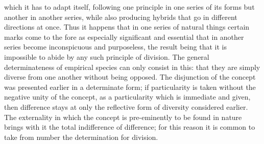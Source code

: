 which it has to adapt itself, following one principle in one series of its
forms but another in another series, while also producing hybrids that go
in different directions at once. Thus it happens that in one series of natural
things certain marks come to the fore as especially significant and essential
that in another series become inconspicuous and purposeless, the result
being that it is impossible to abide by any such principle of division.
The general determinateness of empirical species can only consist in this:
that they are simply diverse from one another without being opposed. The
disjunction of the concept was presented earlier in a determinate form;
if particularity is taken without the negative unity of the concept, as a
particularity which is immediate and given, then difference stays at only
the reflective form of diversity considered earlier. The externality in which
the concept is pre-eminently to be found in nature brings with it the total
indifference of difference; for this reason it is common to take from number
the determination for division.

